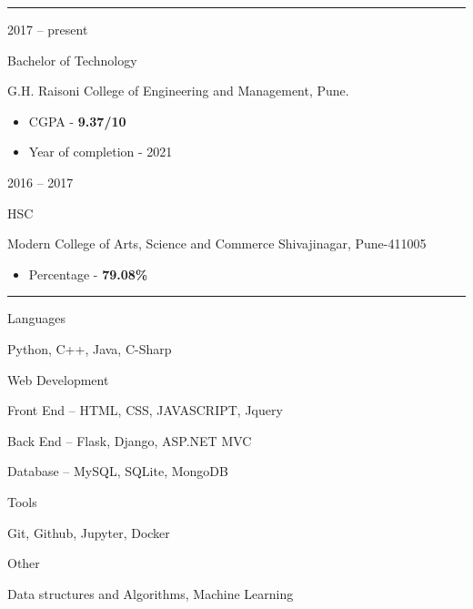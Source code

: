 \documentclass[a4paper,10pt]{article}
\newlength{\cvcolumngapwidth}
\newlength{\cvleftcolumnwidth}
\newlength{\cvrightcolumnwidth}
\newcommand{\cvsectionstyle}[1]{{\normalsize\cvsectionfont\textcolor{cvsectioncolor}{#1}}}
\newcommand{\cvtitlestyle}[1]{{\large\cvtitlefont\textcolor{cvtitlecolor}{#1}}}
\newcommand{\cvdurationstyle}[1]{{\small\cvdurationfont\textcolor{cvdurationcolor}{#1}}}
\newcommand{\cvheadingstyle}[1]{{\normalsize\cvheadingfont\textcolor{cvheadingcolor}{#1}}}
\newlength{\cvafteritemskipamount}
\newlength{\cvaftersectionskipamount}
\newlength{\cvbetweensectionandheadingextraskipamount}
\newlength{\cvaftertitleskipamount}
\newlength{\cvparskip}
\newcommand{\cvsection}[1]{
    \begin{minipage}[t]{\cvleftcolumnwidth}
        \raggedleft\cvsectionstyle{#1}
    \end{minipage}%
    \hspace{\cvcolumngapwidth}%
    \begin{minipage}[t]{\cvrightcolumnwidth}
        \textcolor{cvrulecolor}{\rule{\cvrightcolumnwidth}{0.3mm}}
    \end{minipage}

    \vspace{\cvaftersectionskipamount}
}
\newcommand{\cvitem}[2]{
    \begin{minipage}[t]{\cvleftcolumnwidth}
        \raggedleft #1
    \end{minipage}%
    \hspace{\cvcolumngapwidth}%
    \begin{minipage}[t]{\cvrightcolumnwidth}
        \setlength{\parskip}{\cvparskip} #2
    \end{minipage}

    \vspace{\cvafteritemskipamount}
}
\newcommand{\cvtitle}[1]{
    \cvtitlestyle{#1}

    \vspace{\cvaftertitleskipamount}
    \vspace{-\cvparskip}
}
\begin{document}

\cvsection{EDUCATION}

\cvitem{
    \cvdurationstyle{2017 -- present}
}{
    \cvtitle{Bachelor of Technology}

    G.H. Raisoni College of Engineering and Management, Pune.

    \begin{itemize}[leftmargin=*]
        \item CGPA - \textbf{9.37/10}
        \item Year of completion - 2021
    \end{itemize}
}

\cvitem{
    \cvdurationstyle{2016 -- 2017}
}{
    \cvtitle{HSC}

   Modern College of Arts, Science and Commerce Shivajinagar, Pune-411005

    \begin{itemize}[leftmargin=*]
        \item Percentage - \textbf{79.08\%}
    \end{itemize}
}
\bigskip


\cvsection{SKILLS}

\vspace{\cvbetweensectionandheadingextraskipamount}

\cvitem{
    \cvheadingstyle{Languages}
}{
    \item Python, C++, Java, C-Sharp
}


\cvitem{
    \cvheadingstyle{Web Development}
}{
    \item Front End -- HTML, CSS, JAVASCRIPT, Jquery
    \item Back End  -- Flask, Django, ASP.NET MVC
    \item Database  -- MySQL, SQLite, MongoDB 
}

\cvitem{
    \cvheadingstyle{Tools}
}{
    \item Git, Github, Jupyter, Docker
}
\cvitem{
    \cvheadingstyle{Other}
}{
    \item Data structures and Algorithms, Machine Learning
}
\end{document}
